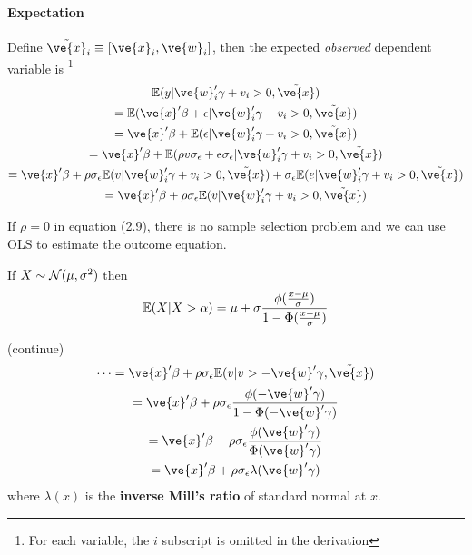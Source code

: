 \documentclass[11pt]{article}
\begin{document}
			\paragraph{Expectation} Define $\tilde{\ve{x}}_i \equiv [\ve{x}_i, \ve{w}_i]$, then the expected \emph{observed} dependent variable is \footnote{For each variable, the $i$ subscript is omitted in the derivation}
			\begin{gather}
				\expect{y | \ve{w}_i' \gamma + v_i > 0, \tilde{\ve{x}}} \\
				= \expect{\ve{x}'\beta + \epsilon | \ve{w}_i' \gamma + v_i > 0, \tilde{\ve{x}}} \\
				= \ve{x}'\beta + \expect{\epsilon | \ve{w}_i' \gamma + v_i > 0, \tilde{\ve{x}}} \\
				= \ve{x}'\beta + \expect{\rho v \sigma_\epsilon + e \sigma_\epsilon | \ve{w}_i' \gamma + v_i > 0, \tilde{\ve{x}}} \\
				= \ve{x}'\beta + \rho \sigma_\epsilon \expect{v | \ve{w}_i' \gamma + v_i > 0, \tilde{\ve{x}}} + \sigma_\epsilon \expect{e | \ve{w}_i' \gamma + v_i > 0, \tilde{\ve{x}}} \\
				= \ve{x}'\beta + \rho \sigma_\epsilon \expect{v | \ve{w}_i' \gamma + v_i > 0, \tilde{\ve{x}}}
			\end{gather}
			\begin{remark}
				If $\rho = 0$ in equation (2.9), there is no sample selection problem and we can use OLS to estimate the outcome equation.
			\end{remark}
			\begin{lemma}
				If $X \sim \mathcal{{N}}(\mu, \sigma^2)$ then
				\begin{gather}
					\mathbb{E}({X|X>\alpha}) = \mu + \sigma \frac{\phi(\frac{x - \mu}{\sigma})}{1 - \Phi(\frac{x-\mu}{\sigma})}
				\end{gather}
			\end{lemma}
			(continue)
			\begin{gather}
				\dots = \ve{x}'\beta + \rho \sigma_\epsilon \expect{v | v > - \ve{w}' \gamma, \tilde{\ve{x}}} \\
				= \ve{x}'\beta + \rho \sigma_\epsilon \frac{\phi(-\ve{w}'\gamma)}{1 - \Phi(-\ve{w}'\gamma)} \\
				= \ve{x}' \beta + \rho \sigma_\epsilon \frac{\phi(\ve{w}'\gamma)}{\Phi(\ve{w}'\gamma)} \\
				= \ve{x}' \beta + \rho \sigma_\epsilon \lambda(\ve{w}'\gamma)
			\end{gather}
			where $\lambda(x)$ is the \textbf{inverse Mill's ratio} of standard normal at $x$.
\end{document}
